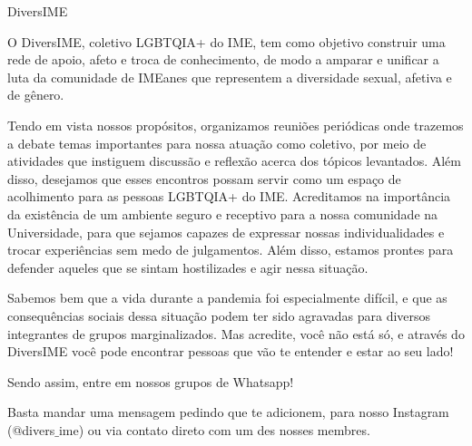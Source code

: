 \begin{subsecao}{DiversIME}

O DiversIME, coletivo LGBTQIA+ do IME, tem como objetivo construir uma rede de
apoio, afeto e troca de conhecimento, de modo a amparar e unificar a luta da
comunidade de IMEanes que representem a diversidade sexual, afetiva e de gênero. 

Tendo em vista nossos propósitos, organizamos reuniões periódicas onde trazemos
a debate temas importantes para nossa atuação como coletivo, por meio de
atividades que instiguem discussão e reflexão acerca dos tópicos levantados.
Além disso, desejamos que esses encontros possam servir como um espaço de
acolhimento para as pessoas LGBTQIA+ do IME. Acreditamos na importância da
existência de um ambiente seguro e receptivo para a nossa comunidade na
Universidade, para que sejamos capazes de expressar nossas individualidades
e trocar experiências sem medo de julgamentos. Além disso, estamos prontes
para defender aqueles que se sintam hostilizades e agir nessa situação. 

Sabemos bem que a vida durante a pandemia foi especialmente difícil, e que as 
consequências sociais dessa situação podem ter sido agravadas para diversos integrantes
de grupos marginalizados. Mas acredite, você não está só, e através do DiversIME
você pode encontrar pessoas que vão te entender e estar ao seu lado!

Sendo assim, entre em nossos grupos de Whatsapp!

Basta mandar uma mensagem pedindo que te adicionem, para nosso Instagram
(@divers$\_$ime) ou via contato direto com um des nosses membres.

\end{subsecao}
